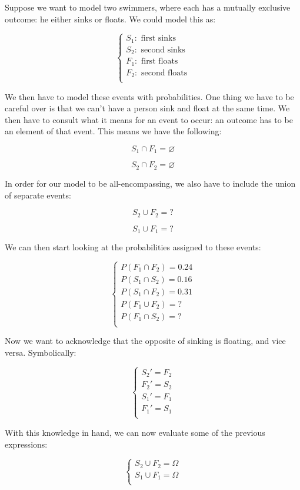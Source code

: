 \documentclass{article}
\begin{document}
Suppose we want to model two swimmers, where each has a mutually
exclusive outcome: he either sinks or floats. We could model this as:

\[
\begin{cases}
S_1:\text{ first sinks} \\
S_2:\text{ second sinks} \\
F_1:\text{ first floats} \\
F_2:\text{ second floats} \\
\end{cases}
\]

We then have to model these events with probabilities. One thing we
have to be careful over is that we can't have a person sink and float
at the same time. We then have to consult what it means for an event
to occur: an outcome has to be an element of that event. This means we
have the following:

\[
S_1\cap F_1 = \varnothing
\]

\[
S_2\cap F_2 = \varnothing
\]

In order for our model to be all-encompassing, we also have to include
the union of separate events:

\[
S_2\cup F_2 = ?
\]

\[
S_1\cup F_1 = ?
\]

We can then start looking at the probabilities assigned to these
events:

\[
\begin{cases}
P(F_1\cap F_2)= 0.24 \\
P(S_1\cap S_2)=0.16 \\
P(S_1\cap F_2)=0.31 \\
P(F_1\cup F_2) = ? \\
P(F_1\cap S_2) = ? \\
\end{cases}
\]

Now we want to acknowledge that the opposite of sinking is floating,
and vice versa. Symbolically:

\[
\begin{cases}
S_2'=F_2 \\
F_2'=S_2 \\
S_1'=F_1 \\
F_1'=S_1 \\
\end{cases}
\]

With this knowledge in hand, we can now evaluate some of the previous
expressions:

\[
\begin{cases}
S_2\cup F_2 = \Omega \\
S_1\cup F_1 = \Omega \\
\end{cases}
\]
\end{document}
